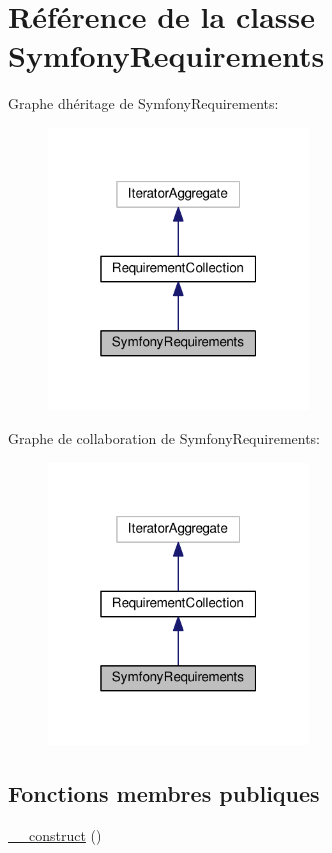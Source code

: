 \hypertarget{classSymfonyRequirements}{}\section{Référence de la classe Symfony\+Requirements}
\label{classSymfonyRequirements}


Graphe d\textquotesingle{}héritage de Symfony\+Requirements\+:\nopagebreak
\begin{figure}[H]
\begin{center}
\leavevmode
\includegraphics[width=196pt]{classSymfonyRequirements__inherit__graph}
\end{center}
\end{figure}


Graphe de collaboration de Symfony\+Requirements\+:\nopagebreak
\begin{figure}[H]
\begin{center}
\leavevmode
\includegraphics[width=196pt]{classSymfonyRequirements__coll__graph}
\end{center}
\end{figure}
\subsection*{Fonctions membres publiques}
\begin{DoxyCompactItemize}
\item 
\hyperlink{classSymfonyRequirements_a9543e8a8cb4c134200fd19a3052cac38}{\+\_\+\+\_\+construct} ()
\end{DoxyCompactItemize}
